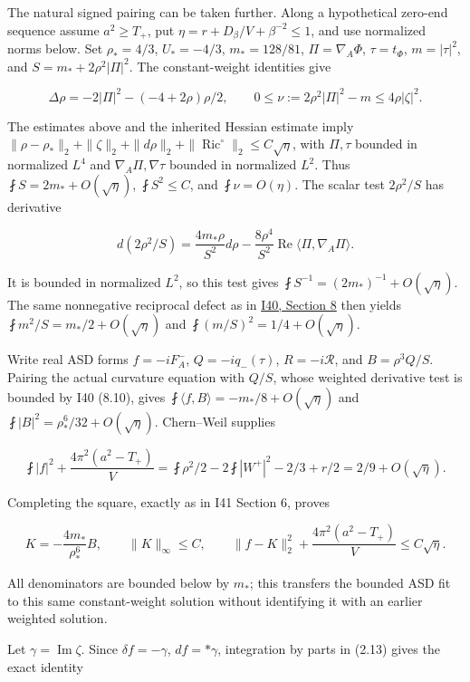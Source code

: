 \documentclass[
  10pt,
]{article}
\begin{document}
The natural signed pairing can be taken further. Along a hypothetical
zero-end sequence assume \(a^2\ge T_+\), put
\(\eta=r+D_\beta/V+\beta^{-2}\le1\), and use normalized norms below. Set
\(\rho_*=4/3\), \(U_*=-4/3\), \(m_*=128/81\), \(\Pi=\nabla_A\Phi\),
\(\tau=t_\Phi\), \(m=|\tau|^2\), and \(S=m_*+2\rho^2|\Pi|^2\). The
constant-weight identities give

\[
\Delta\rho=-2|\Pi|^2-(-4+2\rho)\rho/2,\qquad
0\le\nu:=2\rho^2|\Pi|^2-m\le4\rho|\zeta|^2.
\]

The estimates above and the inherited Hessian estimate imply
\(\|\rho-\rho_*\|_2+\|\zeta\|_2+\|d\rho\|_2 +\|\operatorname{Ric}^{\circ}\|_2\le C\sqrt\eta\),
with \(\Pi,\tau\) bounded in normalized \(L^4\) and
\(\nabla_A\Pi,\nabla\tau\) bounded in normalized \(L^2\). Thus
\(\fint S=2m_*+O(\sqrt\eta)\), \(\fint S^2\le C\), and
\(\fint\nu=O(\eta)\). The scalar test \(2\rho^2/S\) has derivative

\[
d(2\rho^2/S)=\frac{4m_*\rho}{S^2}d\rho
 -\frac{8\rho^4}{S^2}\operatorname{Re}\langle\Pi,\nabla_A\Pi\rangle.
\]

It is bounded in normalized \(L^2\), so this test gives
\(\fint S^{-1}=(2m_*)^{-1}+O(\sqrt\eta)\). The same nonnegative
reciprocal defect as in
\href{20260927_mixed_current_and_signed_cores.md}{I40, Section 8} then
yields \(\fint m^2/S=m_*/2+O(\sqrt\eta)\) and
\(\fint(m/S)^2=1/4+O(\sqrt\eta)\).

Write real ASD forms \(f=-iF_A^-\), \(Q=-iq_-(\tau)\),
\(R=-i\mathcal R\), and \(B=\rho^3Q/S\). Pairing the actual curvature
equation with \(Q/S\), whose weighted derivative test is bounded by I40
(8.10), gives \(\fint\langle f,B\rangle=-m_*/8+O(\sqrt\eta)\) and
\(\fint|B|^2=\rho_*^6/32+O(\sqrt\eta)\). Chern--Weil supplies

\[
 \fint|f|^2+\frac{4\pi^2(a^2-T_+)}V
 =\fint\rho^2/2-2\fint|W^+|^2-2/3+r/2
 =2/9+O(\sqrt\eta).
\]

Completing the square, exactly as in I41 Section 6, proves

\[
 K=-\frac{4m_*}{\rho_*^6}B,\qquad \|K\|_\infty\le C,\qquad
 \|f-K\|_2^2+\frac{4\pi^2(a^2-T_+)}V\le C\sqrt\eta.
 \tag{2.14a}
\]

All denominators are bounded below by \(m_*\); this transfers the
bounded ASD fit to this same constant-weight solution without
identifying it with an earlier weighted solution.

Let \(\gamma=\operatorname{Im}\zeta\). Since \(\delta f=-\gamma\),
\(df=*\gamma\), integration by parts in (2.13) gives the exact identity
\end{document}
